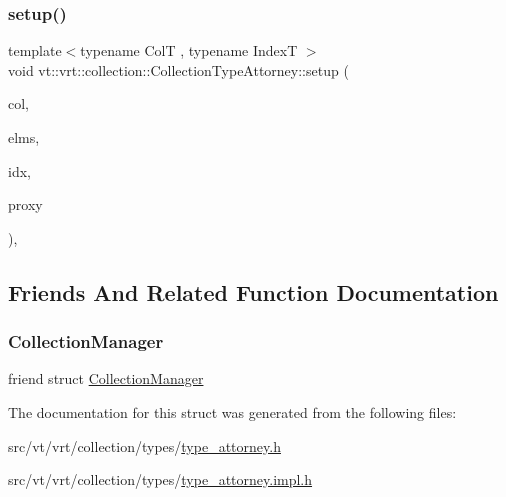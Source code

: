 \subsubsection{\texorpdfstring{setup()}{setup()}}
{\footnotesize\ttfamily template$<$typename ColT , typename IndexT $>$ \\
void vt\+::vrt\+::collection\+::\+Collection\+Type\+Attorney\+::setup (\begin{DoxyParamCaption}\item[{ColT const \&}]{col,  }\item[{\hyperlink{namespacevt_ac115668758184050beff7a9281a2c490}{Virtual\+Elm\+Count\+Type} const \&}]{elms,  }\item[{IndexT const \&}]{idx,  }\item[{\hyperlink{namespacevt_a1b417dd5d684f045bb58a0ede70045ac}{Virtual\+Proxy\+Type} const \&}]{proxy }\end{DoxyParamCaption})\hspace{0.3cm}{\ttfamily [static]}, {\ttfamily [private]}}



\subsection{Friends And Related Function Documentation}
\mbox{\label{structvt_1_1vrt_1_1collection_1_1_collection_type_attorney_af9288b1963f434a90b307b5305a49510}} 
\subsubsection{\texorpdfstring{Collection\+Manager}{CollectionManager}}
{\footnotesize\ttfamily friend struct \hyperlink{structvt_1_1vrt_1_1collection_1_1_collection_manager}{Collection\+Manager}\hspace{0.3cm}{\ttfamily [friend]}}



The documentation for this struct was generated from the following files\+:\begin{DoxyCompactItemize}
\item 
src/vt/vrt/collection/types/\hyperlink{type__attorney_8h}{type\+\_\+attorney.\+h}\item 
src/vt/vrt/collection/types/\hyperlink{type__attorney_8impl_8h}{type\+\_\+attorney.\+impl.\+h}\end{DoxyCompactItemize}
